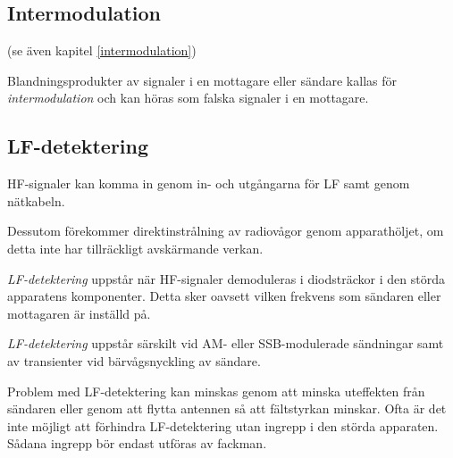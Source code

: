 \subsection{Intermodulation}

(se även kapitel \ref{intermodulation})

Blandningsprodukter av signaler i en mottagare eller sändare kallas för
\emph{intermodulation} och kan höras som falska signaler i en mottagare.

\subsection{LF-detektering}

HF-signaler kan komma in genom in- och utgångarna för LF samt genom nätkabeln.

Dessutom förekommer direktinstrålning av radiovågor genom apparathöljet, om
detta inte har tillräckligt avskärmande verkan.

\emph{LF-detektering} uppstår när HF-signaler demoduleras i diodsträckor i den
störda apparatens komponenter.
Detta sker oavsett vilken frekvens som sändaren eller mottagaren är inställd på.

\emph{LF-detektering} uppstår särskilt vid AM- eller SSB-modulerade sändningar
samt av transienter vid bärvågsnyckling av sändare.

Problem med LF-detektering kan minskas genom att minska uteffekten från sändaren
eller genom att flytta antennen så att fältstyrkan minskar.
Ofta är det inte möjligt att förhindra LF-detektering utan ingrepp i den störda
apparaten.
Sådana ingrepp bör endast utföras av fackman.

